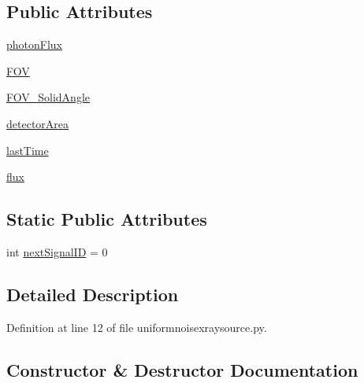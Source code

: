 \subsection*{Public Attributes}
\begin{DoxyCompactItemize}
\item 
\hyperlink{classmodest_1_1signals_1_1uniformnoisexraysource_1_1UniformNoiseXRaySource_a0f958a631c21f5e56d09e1906a50aa18}{photon\+Flux}
\item 
\hyperlink{classmodest_1_1signals_1_1uniformnoisexraysource_1_1UniformNoiseXRaySource_a7cfd254af9003d98214119e5d11f226e}{F\+OV}
\item 
\hyperlink{classmodest_1_1signals_1_1uniformnoisexraysource_1_1UniformNoiseXRaySource_a8cea08a8576dbaaab7da58569eeac3c1}{F\+O\+V\+\_\+\+Solid\+Angle}
\item 
\hyperlink{classmodest_1_1signals_1_1uniformnoisexraysource_1_1UniformNoiseXRaySource_a77090ba977ae75035e7d17b1ae458944}{detector\+Area}
\item 
\hyperlink{classmodest_1_1signals_1_1poissonsource_1_1PoissonSource_a34395fc83bd8743a0a5ee69f9392a606}{last\+Time}
\item 
\hyperlink{classmodest_1_1signals_1_1poissonsource_1_1PoissonSource_a6f2c657ad936b921715d826ac74f7fe5}{flux}
\end{DoxyCompactItemize}
\subsection*{Static Public Attributes}
\begin{DoxyCompactItemize}
\item 
int \hyperlink{classmodest_1_1signals_1_1signalsource_1_1SignalSource_a453eafb550b551adbec0903deb63dfce}{next\+Signal\+ID} = 0
\end{DoxyCompactItemize}


\subsection{Detailed Description}


Definition at line 12 of file uniformnoisexraysource.\+py.



\subsection{Constructor \& Destructor Documentation}
